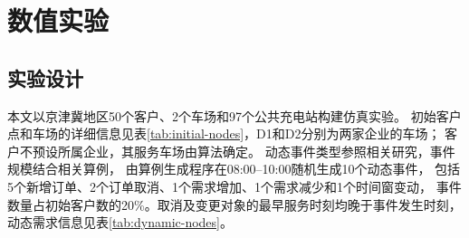 \documentclass{setp-new}
\begin{document}
\section{数值实验}

\subsection{实验设计}

本文以京津冀地区50个客户、2个车场和97个公共充电站构建仿真实验。
初始客户点和车场的详细信息见表\ref{tab:initial-nodes}，D1和D2分别为两家企业的车场；
客户不预设所属企业，其服务车场由算法确定。
动态事件类型参照相关研究\cite{ref:71}，事件规模结合相关算例\cite{ref:51}，
由算例生成程序在08:00--10:00随机生成10个动态事件，
包括5个新增订单、2个订单取消、1个需求增加、1个需求减少和1个时间窗变动，
事件数量占初始客户数的20\%。取消及变更对象的最早服务时刻均晚于事件发生时刻，
动态需求信息见表\ref{tab:dynamic-nodes}。
\end{document}
